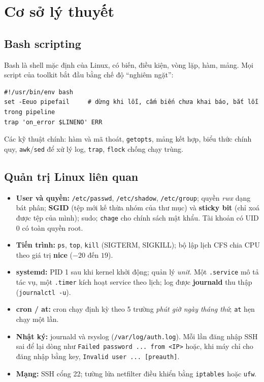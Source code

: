 \documentclass[12pt,a4paper,oneside]{report}
\newcommand{\cmd}[1]{\texttt{\small #1}}
\begin{document}
\chapter{Cơ sở lý thuyết}

\section{Bash scripting}
Bash là shell mặc định của Linux, có biến, điều kiện, vòng lặp, hàm, mảng. Mọi script của toolkit bắt đầu bằng chế độ ``nghiêm ngặt'':
\begin{Verbatim}
#!/usr/bin/env bash
set -Eeuo pipefail     # dừng khi lỗi, cấm biến chưa khai báo, bắt lỗi trong pipeline
trap 'on_error $LINENO' ERR
\end{Verbatim}
Các kỹ thuật chính: hàm và mã thoát, \cmd{getopts}, mảng kết hợp, biểu thức chính quy, \cmd{awk}/\cmd{sed} để xử lý log, \cmd{trap}, \cmd{flock} chống chạy trùng.

\section{Quản trị Linux liên quan}
\begin{itemize}
  \item \textbf{User và quyền:} \cmd{/etc/passwd}, \cmd{/etc/shadow}, \cmd{/etc/group}; quyền \textit{rwx} dạng bát phân; \textbf{SGID} (tệp mới kế thừa nhóm của thư mục) và \textbf{sticky bit} (chỉ xoá được tệp của mình); sudo; \cmd{chage} cho chính sách mật khẩu. Tài khoản có UID 0 có toàn quyền root.
  \item \textbf{Tiến trình:} \cmd{ps}, \cmd{top}, \cmd{kill} (SIGTERM, SIGKILL); bộ lập lịch CFS chia CPU theo giá trị \textbf{nice} ($-20$ đến $19$).
  \item \textbf{systemd:} PID 1 sau khi kernel khởi động; quản lý \textit{unit}. Một \cmd{.service} mô tả tác vụ, một \cmd{.timer} kích hoạt service theo lịch; log được \textbf{journald} thu thập (\cmd{journalctl -u}).
  \item \textbf{cron / at:} cron chạy định kỳ theo 5 trường \textit{phút giờ ngày tháng thứ}; \cmd{at} hẹn chạy một lần.
  \item \textbf{Nhật ký:} journald và rsyslog (\cmd{/var/log/auth.log}). Mỗi lần đăng nhập SSH sai để lại dòng như \cmd{Failed password ... from <IP>} hoặc, khi máy chỉ cho đăng nhập bằng key, \cmd{Invalid user ... [preauth]}.
  \item \textbf{Mạng:} SSH cổng 22; tường lửa netfilter điều khiển bằng \cmd{iptables} hoặc \cmd{ufw}.
\end{itemize}
\end{document}
